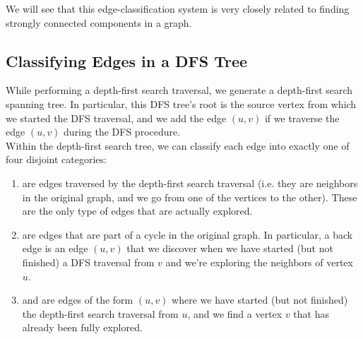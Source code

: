 We will see that this edge-classification system is very closely related to finding strongly connected components in a graph.

\subsection{Classifying Edges in a DFS Tree}

While performing a depth-first search traversal, we generate a depth-first search spanning tree. In particular, this DFS tree's root is the source vertex from which we started the DFS traversal, and we add the edge $(u, v)$ if we traverse the edge $(u, v)$ during the DFS procedure.  \\

Within the depth-first search tree, we can classify each edge into exactly one of four disjoint categories: 

\begin{enumerate}
    \item {} are edges traversed by the depth-first search traversal (i.e. they are neighbors in the original graph, and we go from one of the vertices to the other). These are the only type of edges that are actually explored. 
    \item {} are edges that are part of a cycle in the original graph. In particular, a back edge is an edge $(u, v)$ that we discover when we have started (but not finished) a DFS traversal from $v$ and we're exploring the neighbors of vertex $u$.  
    \item {} and  are edges of the form $(u,  v)$ where we have started (but not finished) the depth-first search traversal from $u$, and we find a vertex $v$ that has already been fully explored.
\end{enumerate}

